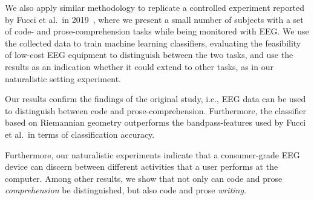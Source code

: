 We also apply similar methodology to replicate a controlled experiment reported by Fucci et al.~in 2019~\cite{fucci_replication_2019}, where we present a small number of subjects with a set of code- and prose-comprehension tasks while being monitored with EEG\@. We use the collected data to train machine learning classifiers, evaluating the feasibility of low-cost EEG equipment to distinguish between the two tasks, and use the results as an indication whether it could extend to other tasks, as in our naturalistic setting experiment.


Our results confirm the findings of the original study, i.e., EEG data can be used to distinguish between code and prose-comprehension. Furthermore, the classifier based on Riemannian geometry outperforms the bandpass-features used by Fucci et al.~in terms of classification accuracy.

Furthermore, our naturalistic experiments indicate that a consumer-grade EEG device can discern between different activities that a user performs at the computer. Among other results, we show that not only can code and prose \emph{comprehension} be distinguished, but also code and prose \emph{writing}.

% 
%
%
%




